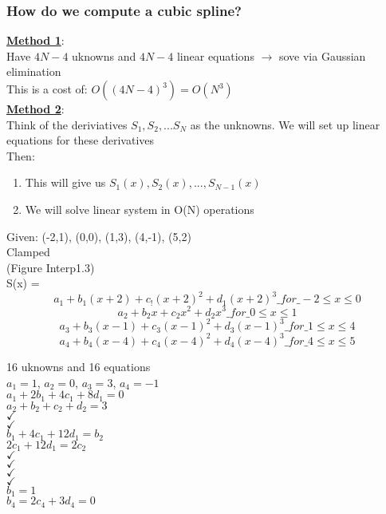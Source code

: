 \documentclass[12pt]{article}
\newcommand{\myt}[1]{\textbf{\underline{#1}}}
\begin{document}
	\subsubsection*{How do we compute a cubic spline?}
	\myt{Method 1}:\\
	Have $4N-4$ uknowns and $4N-4$ linear equations $\rightarrow$ sove via Gaussian elimination\\
	This is a cost of: $O((4N-4)^3) = O(N^3)$\\
	
	\myt{Method 2}:\\
	Think of the deriviatives $S_1, S_2, ... S_N$ as the unknowns. We will set up linear equations for these derivatives\\
	Then:\\
	\begin{enumerate}
		\item This will give us $S_1(x),S_2(x), ..., S_{N-1}(x)$
		\item We will solve linear system in O(N) operations
	\end{enumerate}

	Given: (-2,1), (0,0), (1,3), (4,-1), (5,2)\\
	Clamped\\
	(Figure Interp1.3)\\
	
	S(x) = \\
	$$a_1 + b_1(x+2) + c_!(x+2)^2 + d_1(x+2)^3 \_for\_ -2 \le x \le 0$$
	$$a_2 + b_2x + c_2x^2 + d_2x^3 \_for\_ 0 \le x \le 1$$
	$$a_3 + b_3(x-1) + c_3(x-1)^2 + d_3(x-1)^3 \_for\_ 1 \le x \le 4$$
	$$a_4 + b_4(x-4) + c_4(x-4)^2 + d_4(x-4)^3 \_for\_ 4 \le x \le 5$$
	
	16 uknowns and 16 equations\\
	$a_1 = 1$, $a_2 = 0$, $a_3 = 3$, $a_4 = -1$\\
	$a_1 + 2b_1 + 4c_1 + 8d_1 = 0$\\
	$a_2 + b_2 + c_2 + d_2 = 3$\\
	$\checkmark$\\
	$\checkmark$\\
	$b_1 + 4c_1 + 12d_1 = b_2$\\
	$2c_1 + 12d_1 = 2c_2$\\
	$\checkmark$\\
	$\checkmark$\\
	$\checkmark$\\
	$\checkmark$\\
	$b_1 = 1$\\
	$b_4 = 2c_4 + 3d_4 = 0$\\
	
\end{document}
